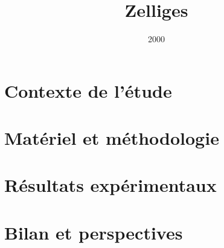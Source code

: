 \documentclass[%
  dvipsnames, %
  svgnames, %
  a4paper, %
  twoside, %
  openany, %
  10pt, %
  oldfontcommands %
]{nefermemoir}
\title{Zelliges}
\author{\SL}
\date{2000}
\begin{document}
\thispagestyle{empty}
\maketitle

\CaptionPetit

\frontmatter
\tableofcontents*

\mainmatter
\part{Contexte de l'étude}


\part{Matériel et méthodologie}


\part{Résultats expérimentaux}






\part{Bilan et perspectives}


\appendix


\backmatter
\newpage
\listoffigures
\listoftables

\nocite{*}
\printbibliography[heading=memoir,title=Bibliographie]

\cleardoublepage
\pagestyle{empty}
~\newpage


\end{document}

